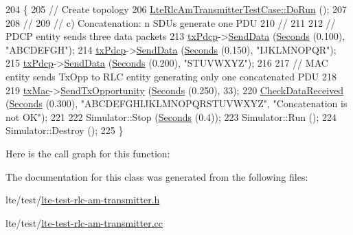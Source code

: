 \begin{DoxyCode}
204 \{
205   \textcolor{comment}{// Create topology}
206   \hyperlink{classLteRlcAmTransmitterTestCase_a2d68ba91ebca75e75efb88365f958d2c}{LteRlcAmTransmitterTestCase::DoRun} ();
207 
208   \textcolor{comment}{//}
209   \textcolor{comment}{// c) Concatenation: n SDUs generate one PDU}
210   \textcolor{comment}{//}
211 
212   \textcolor{comment}{// PDCP entity sends three data packets}
213   \hyperlink{classLteRlcAmTransmitterTestCase_a05f1f1654108d96efa96f08f3cfa9157}{txPdcp}->\hyperlink{classns3_1_1LteTestPdcp_ae29e8e3bd1b7719af4d524b6ea5aed86}{SendData} (\hyperlink{group__timecivil_ga33c34b816f8ff6628e33d5c8e9713b9e}{Seconds} (0.100), \textcolor{stringliteral}{"ABCDEFGH"});
214   \hyperlink{classLteRlcAmTransmitterTestCase_a05f1f1654108d96efa96f08f3cfa9157}{txPdcp}->\hyperlink{classns3_1_1LteTestPdcp_ae29e8e3bd1b7719af4d524b6ea5aed86}{SendData} (\hyperlink{group__timecivil_ga33c34b816f8ff6628e33d5c8e9713b9e}{Seconds} (0.150), \textcolor{stringliteral}{"IJKLMNOPQR"});
215   \hyperlink{classLteRlcAmTransmitterTestCase_a05f1f1654108d96efa96f08f3cfa9157}{txPdcp}->\hyperlink{classns3_1_1LteTestPdcp_ae29e8e3bd1b7719af4d524b6ea5aed86}{SendData} (\hyperlink{group__timecivil_ga33c34b816f8ff6628e33d5c8e9713b9e}{Seconds} (0.200), \textcolor{stringliteral}{"STUVWXYZ"});
216 
217   \textcolor{comment}{// MAC entity sends TxOpp to RLC entity generating only one concatenated PDU}
218 
219   \hyperlink{classLteRlcAmTransmitterTestCase_aef4a21987514cf7f0b7a71794022f096}{txMac}->\hyperlink{classns3_1_1LteTestMac_a3af5da64ba337869f4082118194f6641}{SendTxOpportunity} (\hyperlink{group__timecivil_ga33c34b816f8ff6628e33d5c8e9713b9e}{Seconds} (0.250), 33);
220   \hyperlink{classLteRlcAmTransmitterTestCase_a5cc6b6ad30c74a923b417ecac909ffbc}{CheckDataReceived} (\hyperlink{group__timecivil_ga33c34b816f8ff6628e33d5c8e9713b9e}{Seconds} (0.300), \textcolor{stringliteral}{"ABCDEFGHIJKLMNOPQRSTUVWXYZ"}, \textcolor{stringliteral}{"Concatenation
       is not OK"});
221 
222   Simulator::Stop (\hyperlink{group__timecivil_ga33c34b816f8ff6628e33d5c8e9713b9e}{Seconds} (0.4));
223   Simulator::Run ();
224   Simulator::Destroy ();
225 \}
\end{DoxyCode}


Here is the call graph for this function\+:




The documentation for this class was generated from the following files\+:\begin{DoxyCompactItemize}
\item 
lte/test/\hyperlink{lte-test-rlc-am-transmitter_8h}{lte-\/test-\/rlc-\/am-\/transmitter.\+h}\item 
lte/test/\hyperlink{lte-test-rlc-am-transmitter_8cc}{lte-\/test-\/rlc-\/am-\/transmitter.\+cc}\end{DoxyCompactItemize}
